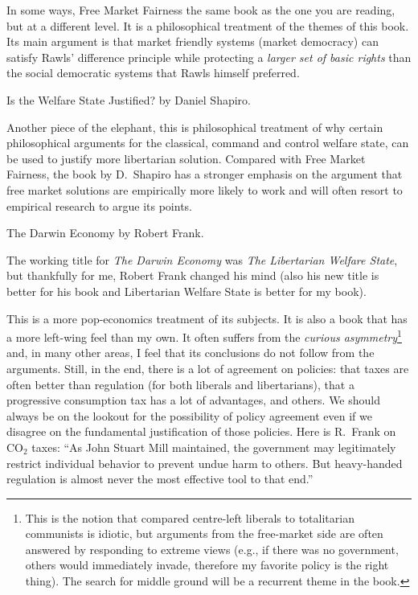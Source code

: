 In some ways, Free Market Fairness the same book as the one you are reading,
but at a different level. It is a philosophical treatment of the themes of this
book. Its main argument is that market friendly systems (market democracy) can
satisfy Rawls' difference principle while protecting a \emph{larger set of
basic rights} than the social democratic systems that Rawls himself preferred.

\book Is the Welfare State Justified? by Daniel Shapiro.

Another piece of the elephant, this is philosophical treatment of why certain
philosophical arguments for the classical, command and control welfare state,
can be used to justify more libertarian solution. Compared with Free Market
Fairness, the book by D.\ Shapiro has a stronger emphasis on the argument that
free market solutions are empirically more likely to work and will often resort
to empirical research to argue its points.

\book The Darwin Economy by Robert Frank.

The working title for \emph{The Darwin Economy} was \emph{The Libertarian
Welfare State}, but thankfully for me, Robert Frank changed his mind (also his
new title is better for his book and Libertarian Welfare State is better for my
book).

This is a more pop-economics treatment of its subjects. It is also a book that
has a more left-wing feel than my own. It often suffers from the \emph{curious
asymmetry}\footnote{This is the notion that compared centre-left liberals to
totalitarian communists is idiotic, but arguments from the free-market side are
often answered by responding to extreme views (e.g., if there was no
government, others would immediately invade, therefore my favorite policy is
the right thing). The search for middle ground will be a recurrent theme in the
book.} and, in many other areas, I feel that its conclusions do not follow from
the arguments. Still, in the end, there is a lot of agreement on policies: that
taxes are often better than regulation (for both liberals and libertarians),
that a progressive consumption tax has a lot of advantages, and others. We
should always be on the lookout for the possibility of policy agreement even if
we disagree on the fundamental justification of those policies. Here is R.\ Frank
on CO$_2$ taxes: ``As John Stuart Mill maintained, the government may
legitimately restrict individual behavior to prevent undue harm to others. But
heavy-handed regulation is almost never the most effective tool to that end.''

